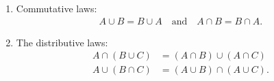     \begin{theorem}
        \begin{enumerate}[label=\alph*)]
        \item Commutative laws:
            \begin{align*}
            A \cup B = B \cup A \quad \text{and} \quad A \cap B = B \cap A .
            \end{align*}
        \item The distributive laws:
            \begin{align}
            A \cap (B \cup C ) &= (A \cap B) \cup (A \cap C ) \\
            A \cup (B \cap C ) &= (A \cup B) \cap (A \cup C ) .
            \end{align}
        \end{enumerate}
    \end{theorem}

